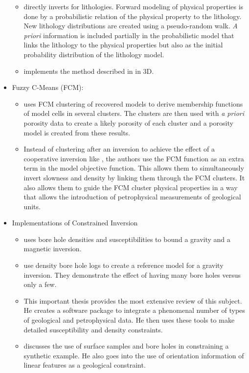 \begin{itemize}
\begin{itemize}
\item \cite{bosch2001lithologic} directly inverts for lithologies. Forward modeling of physical properties is done by a probabilistic relation of the physical property to the lithology. New lithology distributions are created using a pseudo-random walk. \emph{A priori} information is included partially in the probabilistic model that links the lithology to the physical properties but also as the initial probability distribution of the lithology model.
\item \cite{guillen2008geological} implements the method described in \cite{bosch2001lithologic} in 3D.
\end{itemize}
\item Fuzzy C-Means (FCM): 
\begin{itemize}
	\item \cite{paasche2006integration} uses FCM clustering of recovered models to derive membership functions of model cells in several clusters. The clusters are then used with \emph{a priori} porosity data to create a likely porosity of each cluster and a porosity model is created from these results.
	\item \cite{sun2015multidomain} Instead of clustering after an inversion to achieve the effect of a cooperative inversion like \cite{paasche2006integration}, the authors use the FCM function as an extra term in the model objective function. This allows them to simultaneously invert slowness and density by linking them through the FCM clusters. It also allows them to guide the FCM cluster physical properties in a way that allows the introduction of petrophysical measurements of geological units.
\end{itemize}
\item Implementations of Constrained Inversion
\begin{itemize}
	\item \cite{phillips2001thesis} uses bore hole densities and susceptibilities to bound a gravity and a magnetic inversion.
	\item \cite{farquharson2008geologically} use density bore hole logs to create a reference model for a gravity inversion. They demonstrate  the effect of having many bore holes versus only a few.
	\item \cite{williams2008geologically} This important thesis provides the most extensive review of this subject. He creates a software package to integrate a phenomenal number of types of geological and petrophysical data. He then uses these tools to make detailed susceptibility and density constraints.
	\item \cite{Lelievre2009Integrating} discusses the use of surface samples and bore holes in constraining a synthetic example. He also goes into the use of orientation information of linear features as a geological constraint.
	

\end{itemize}
\end{itemize}
